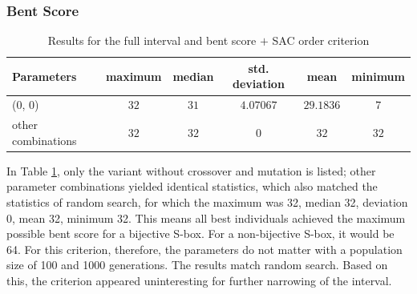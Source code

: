 \subsubsection{Bent Score}
\begin{table}[tb]
\begin{center}
\begin{tabular}{| l | c | c | c | c | c |}
\hline
Parameters & maximum & median & std. deviation & mean & minimum \\ \hline
(0, 0) & $32$ & $31$ & $4.07067$ & $29.1836$ & $7$ \\ \hline
other combinations & $32$ & $32$ & $0$ & $32$ & $32$ \\ \hline
\end{tabular}
\caption{Results for the full interval and bent score $+$ SAC order criterion}
\label{tabBENT_AND_MOSACParameters}
\end{center}
\end{table}
In Table \ref{tabBENT_AND_MOSACParameters}, only the variant without
crossover and mutation is listed; other parameter combinations yielded identical statistics,
which also matched the statistics of random search,
for which the maximum was 32, median 32, deviation 0, mean 32, minimum 32.
This means all best individuals achieved the maximum possible bent score for
a bijective S-box. For a non-bijective S-box, it would be 64.
For this criterion, therefore, the parameters do not matter with a population size
of 100 and 1000 generations. The results match random search.
Based on this, the criterion appeared uninteresting for further narrowing of the interval.

